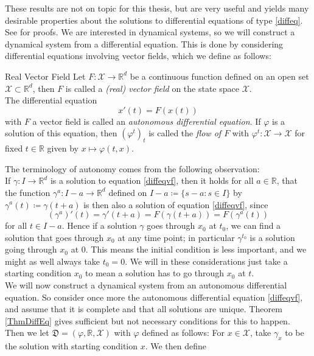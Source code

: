 \documentclass[11pt, a4paper]{memoir}
\theoremstyle{break}
\theoremstyle{break}
\theoremstyle{nonumberplain}
\newcommand{\mR}{\mathbb{R}}
\begin{document}
These results are not on topic for this thesis, but are very useful and yields many desirable properties about the solutions to differential equations of type \ref{diffeq}. See \cite{Dynamics} for proofs. We are interested in dynamical systems, so we will construct a dynamical system from a differential equation. This is done by considering differential equations involving vector fields, which we define as follows:
\begin{mydefinition}{Real Vector Field}
Let $F:\mathcal{X}\to\mR^d$ be a continuous function defined on an open set $\mathcal{X}\subset \mR^d$, then $F$ is called a \emph{(real) vector field} on the state space $\mathcal{X}$.\\[5pt]
The differential equation
\begin{equation}\label{diffeqvf}
x'(t)=F(x(t))
\end{equation}
with $F$ a vector field is called an \emph{autonomous differential equation}. If $\varphi$ is a solution of this equation, then $(\varphi^t)_t$ is called the \emph{flow of $F$} with $\varphi^t: \mathcal{X}\to \mathcal{X}$ for fixed $t\in \mR$ given by $x\mapsto\varphi(t,x)$.
\end{mydefinition}
\noindent The terminology of autonomy comes from the following observation:\\
If $\gamma:I\to\mR^d$ is a solution to equation \ref{diffeqvf}, then it holds for all $a\in\mR$, that the function $\gamma^a:I-a\to\mR^d$ defined on $I-a\coloneqq \{s-a: s\in I\}$ by $\gamma^a(t)\coloneqq \gamma(t+a)$ is then also a solution of equation \ref{diffeqvf}, since
$$\left(\gamma^a\right)'(t)=\gamma '(t+a)=F(\gamma(t+a))=F(\gamma^a(t))$$
for all $t\in I-a$. Hence if a solution $\gamma$ goes through $x_0$ at $t_0$, we can find a solution that goes through $x_0$ at any time point; in particular $\gamma^{t_0}$ is a solution going through $x_0$ at $0$. This means the initial condition is less important, and we might as well always take $t_0=0$. We will in these considerations just take a starting condition $x_0$ to mean a solution has to go through $x_0$ at $t$.\\[5pt]
We will now construct a dynamical system from an autonomous differential equation. So consider once more the autonomous differential equation \ref{diffeqvf}, and assume that it is complete and that all solutions are unique. Theorem \ref{ThmDiffEq} gives sufficient but not necessary conditions for this to happen. Then we let $\mathfrak{D}=(\varphi,\mR,\mathcal{X})$ with $\varphi$ defined as follows: For $x\in \mathcal{X}$, take $\gamma_x$ to be the solution with starting condition $x$. We then define
\end{document}
